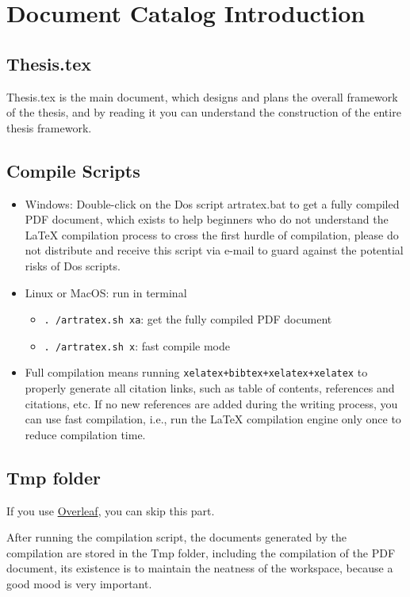 \section{Document Catalog Introduction}

\subsection{Thesis.tex}

Thesis.tex is the main document, which designs and plans the overall framework of the thesis, and by reading it you can understand the construction of the entire thesis framework.

\subsection{Compile Scripts}

\begin{itemize}
    \item Windows: Double-click on the Dos script artratex.bat to get a fully compiled PDF document, which exists to help beginners who do not understand the LaTeX compilation process to cross the first hurdle of compilation, please do not distribute and receive this script via e-mail to guard against the potential risks of Dos scripts.
    \item Linux or MacOS: run in terminal
        \begin{itemize}
            \item \verb|. /artratex.sh xa|: get the fully compiled PDF document
            \item \verb|. /artratex.sh x|: fast compile mode
        \end{itemize}
    \item Full compilation means running \verb|xelatex+bibtex+xelatex+xelatex| to properly generate all citation links, such as table of contents, references and citations, etc. If no new references are added during the writing process, you can use fast compilation, i.e., run the LaTeX compilation engine only once to reduce compilation time.
\end{itemize}

\subsection{Tmp folder}
If you use \href{https://www.overleaf.com/}{Overleaf}, you can skip this part.

After running the compilation script, the documents generated by the compilation are stored in the Tmp folder, including the compilation of the PDF document, its existence is to maintain the neatness of the workspace, because a good mood is very important.

